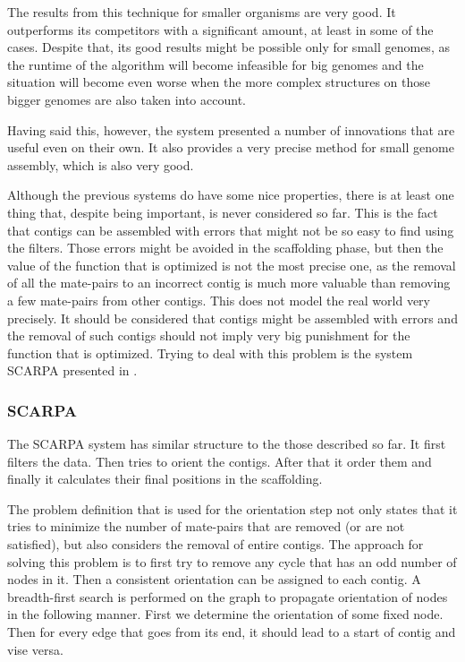 \documentclass[11pt]{article}
\begin{document}
The results from this technique for smaller organisms are very good. It
outperforms its competitors with a significant amount, at least in some of the
cases. Despite that, its good results might be possible only for small genomes,
as the runtime of the algorithm will become infeasible for big genomes and the
situation will become even worse when the more complex structures on those
bigger genomes are also taken into account.

Having said this, however, the system presented a number of innovations that are
useful even on their own. It also provides a very precise method for small
genome assembly, which is also very good.

Although the previous systems do have some nice properties, there is at least
one thing that, despite being important, is never considered so far. This is the
fact that contigs can be assembled with errors that might not be so easy to find
using the filters. Those errors might be avoided in the scaffolding phase, but
then the value of the function that is optimized is not the most precise one, as
the removal of all the mate-pairs to an incorrect contig is much more valuable
than removing a few mate-pairs from other contigs. This does not model the real
world very precisely. It should be considered that contigs might be assembled
with errors and the removal of such contigs should not imply very big punishment
for the function that is optimized. Trying to deal with this problem is the
system SCARPA presented in \cite{SCARPA}.

\subsubsection{SCARPA} %
\label{ssub:SCARPA}
The SCARPA system has similar structure to the those described so far. It first
filters the data. Then tries to orient the contigs. After that it order them and
finally it calculates their final positions in the scaffolding.

The problem definition that is used for the orientation step not only states
that it tries to minimize the number of mate-pairs that are removed (or are not
satisfied), but also considers the removal of entire contigs. The approach for
solving this problem is to first try to remove any cycle that has an odd number
of nodes in it. Then a consistent orientation can be assigned to each
contig. A breadth-first search is performed on the graph to propagate
orientation of nodes in the following manner. First we determine the orientation
of some fixed node. Then for every edge that goes from its end, it should lead
to a start of contig and vise versa.
\end{document}
